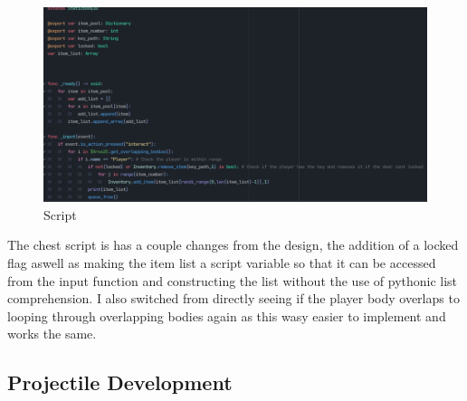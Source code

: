 \documentclass{article}
\begin{document}
        \begin{figure}[H]
                \centering
                \includegraphics[width = 0.9\columnwidth]{images/development/Chest_script.PNG}
                \caption{Script}
        \end{figure}
        \noindent The chest script is has a couple changes from the design, the addition of a locked flag aswell as making the item list a script variable so that it can be accessed from the input function and constructing the list without the use of pythonic list comprehension. I also switched from directly seeing if the player body overlaps to looping through overlapping bodies again as this wasy easier to implement and works the same.\\
        \subsection{Projectile Development}
\end{document}
